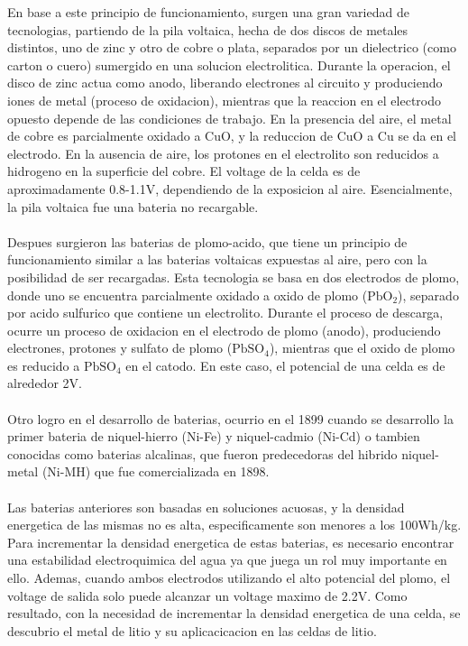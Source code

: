 \documentclass[10pt,a4paper]{article}
\begin{document}
    \noindent En base a este principio de funcionamiento, surgen una gran 
    variedad de tecnologias, partiendo de la pila voltaica, hecha de dos discos
    de metales distintos, uno de zinc y otro de cobre o plata, separados por un
    dielectrico (como carton o cuero) sumergido en una solucion electrolitica.
    Durante la operacion, el disco de zinc actua como anodo, liberando
    electrones al circuito y produciendo iones de metal (proceso de oxidacion),
    mientras que la reaccion en el electrodo opuesto depende de las condiciones
    de trabajo. En la presencia del aire, el metal de cobre es parcialmente
    oxidado a CuO, y la reduccion de CuO a Cu se da en el electrodo. En la
    ausencia de aire, los protones en el electrolito son reducidos a hidrogeno
    en la superficie del cobre. El voltage de la celda es de aproximadamente
    0.8-1.1V, dependiendo de la exposicion al aire. Esencialmente, la pila
    voltaica fue una bateria no recargable. \\
    \\
    \noindent Despues surgieron las baterias de plomo-acido, que tiene un 
    principio de funcionamiento similar a las baterias voltaicas expuestas al 
    aire, pero con la posibilidad de ser recargadas. Esta tecnologia se basa en 
    dos electrodos de plomo, donde uno se encuentra parcialmente oxidado a 
    oxido de plomo ($\mathrm{PbO_2}$), separado por acido sulfurico que contiene un 
    electrolito. Durante el proceso de descarga, ocurre un proceso de oxidacion 
    en el electrodo de plomo (anodo), produciendo electrones, protones y 
    sulfato de plomo ($\mathrm{PbSO_4}$), mientras que el oxido de plomo es 
    reducido a $\mathrm{PbSO_4}$ en el catodo. En este caso, el potencial de 
    una celda es de alrededor 2V.\\
    \\
    \noindent Otro logro en el desarrollo de baterias, ocurrio en el 1899 cuando 
    se desarrollo la primer bateria de niquel-hierro (Ni-Fe) y niquel-cadmio
    (Ni-Cd) o tambien conocidas como baterias alcalinas, que fueron
    predecedoras del hibrido niquel-metal (Ni-MH) que fue comercializada en
    1898.\\
    \\
    \noindent Las baterias anteriores son basadas en soluciones acuosas, y la
    densidad energetica de las mismas no es alta, especificamente son menores a
    los 100Wh/kg. Para incrementar la densidad energetica de estas baterias, es necesario
    encontrar una estabilidad electroquimica del agua ya que juega un rol muy
    importante en ello. Ademas, cuando ambos electrodos utilizando el alto 
    potencial del plomo, el voltage de salida solo puede alcanzar un voltage 
    maximo de 2.2V. Como resultado, con la necesidad de incrementar la densidad
    energetica de una celda, se descubrio el metal de litio y su aplicacicacion
    en las celdas de litio.
\end{document}
